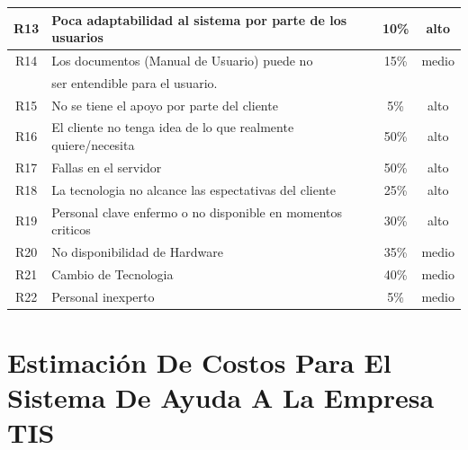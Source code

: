 \documentclass[11pt,letterpaper]{report}
\begin{document}
\begin{tabular}{|c|l|c|c|}
	R13 & Poca adaptabilidad al sistema por parte de los usuarios & 10\% & alto  \\ \hline
	R14 & Los documentos (Manual de Usuario) puede no  & 15\% & medio \\ 
	& ser entendible para el usuario. && \\ \hline
	R15 & No se tiene el apoyo por parte del cliente & 5\% & alto \\ \hline
	R16 & El cliente no tenga idea de lo que realmente quiere/necesita & 50\% & alto \\ \hline
	R17 & Fallas en el servidor & 50\% & alto \\ \hline
	R18 & La tecnologia no alcance las espectativas del cliente & 25\% & alto \\ \hline
	R19 & Personal clave enfermo o no disponible en momentos criticos & 30\% & alto \\ \hline
	R20 & No disponibilidad de Hardware & 35\% & medio \\ \hline
	R21 & Cambio de Tecnologia & 40\% & medio \\ \hline
	R22 & Personal inexperto & 5\% & medio \\ \hline
\end{tabular}
\section{Estimación De Costos Para El Sistema De Ayuda A La Empresa TIS}
\end{document}
